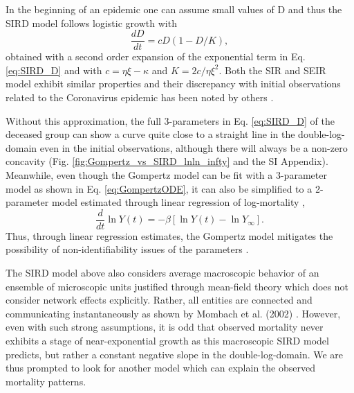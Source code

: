 \documentclass{article}
\begin{document}
In the beginning of an epidemic one can assume small values of D and thus the SIRD model follows logistic growth with
\begin{equation}
\frac{dD}{dt} = c D (1 - D/K),
\end{equation}
obtained with a second order expansion of the exponential term in Eq. \ref{eq:SIRD_D} and with $c=\eta\xi - \kappa$ and $K=2c/\eta\xi^2$. Both the SIR and SEIR model exhibit similar properties and their discrepancy with initial observations related to the Coronavirus epidemic has been noted by others \cite{vattay2020forecasting}.

Without this approximation, the full 3-parameters in Eq. \ref{eq:SIRD_D} of the deceased group can show a curve quite close to a straight line in the double-log-domain even in the initial observations, although there will always be a non-zero concavity (Fig. \ref{fig:Gompertz_vs_SIRD_lnln_infty} and the SI Appendix).
Meanwhile, even though the Gompertz model can be fit with a 3-parameter model as shown in Eq. \ref{eq:GompertzODE}, it can also be simplified to a 2-parameter model estimated through linear regression of log-mortality \cite{Levitt2020},
\begin{equation}
\label{eq:GompertzODE2param}
\frac{d}{dt}\ln{Y(t)} = -\beta\left[\ln{Y(t)} - \ln {Y_{\infty}}\right].
\end{equation}
Thus, through linear regression estimates, the Gompertz model mitigates the possibility of non-identifiability issues of the parameters \cite{roda2020difficult}.

The SIRD model above also considers average macroscopic behavior of an ensemble of microscopic units justified through mean-field theory \cite{smilkov2014beyond} which does not consider network effects explicitly. Rather, all entities are connected and communicating instantaneously as shown by Mombach et al. (2002) \cite{mombach2002mean}.
However, even with such strong assumptions, it is odd that observed mortality never exhibits a stage of near-exponential growth as this macroscopic SIRD model predicts, but rather a constant negative slope in the double-log-domain. We are thus prompted to look for another model which can explain the observed mortality patterns.
\end{document}
